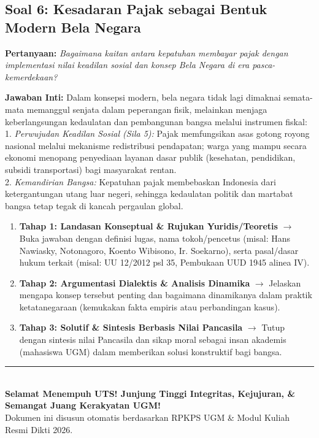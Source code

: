 \documentclass[10pt,a4paper]{article}
\begin{document}
\subsection{Soal 6: Kesadaran Pajak sebagai Bentuk Modern Bela Negara}
\textbf{Pertanyaan:} \textit{Bagaimana kaitan antara kepatuhan membayar pajak dengan implementasi nilai keadilan sosial dan konsep Bela Negara di era pasca-kemerdekaan?}
\begin{conceptbox}
\textbf{Jawaban Inti:} Dalam konsepsi modern, bela negara tidak lagi dimaknai semata-mata memanggul senjata dalam peperangan fisik, melainkan menjaga keberlangsungan kedaulatan dan pembangunan bangsa melalui instrumen fiskal:\\
1. \textit{Perwujudan Keadilan Sosial (Sila 5):} Pajak memfungsikan asas gotong royong nasional melalui mekanisme redistribusi pendapatan; warga yang mampu secara ekonomi menopang penyediaan layanan dasar publik (kesehatan, pendidikan, subsidi transportasi) bagi masyarakat rentan.\\
2. \textit{Kemandirian Bangsa:} Kepatuhan pajak membebaskan Indonesia dari ketergantungan utang luar negeri, sehingga kedaulatan politik dan martabat bangsa tetap tegak di kancah pergaulan global.
\end{conceptbox}

\begin{examtipbox}
\begin{enumerate}
  \item \textbf{Tahap 1: Landasan Konseptual \& Rujukan Yuridis/Teoretis} $\rightarrow$ Buka jawaban dengan definisi lugas, nama tokoh/pencetus (misal: Hans Nawiasky, Notonagoro, Koento Wibisono, Ir. Soekarno), serta pasal/dasar hukum terkait (misal: UU 12/2012 psl 35, Pembukaan UUD 1945 alinea IV).
  \item \textbf{Tahap 2: Argumentasi Dialektis \& Analisis Dinamika} $\rightarrow$ Jelaskan mengapa konsep tersebut penting dan bagaimana dinamikanya dalam praktik ketatanegaraan (kemukakan fakta empiris atau perbandingan kasus).
  \item \textbf{Tahap 3: Solutif \& Sintesis Berbasis Nilai Pancasila} $\rightarrow$ Tutup dengan sintesis nilai Pancasila dan sikap moral sebagai insan akademis (mahasiswa UGM) dalam memberikan solusi konstruktif bagi bangsa.
\end{enumerate}
\end{examtipbox}

\vspace{3mm}
\begin{center}
  \rule{0.5\linewidth}{0.6pt}\\[2mm]
  {\small\bfseries\color{ugmblue}Selamat Menempuh UTS! Junjung Tinggi Integritas, Kejujuran, \& Semangat Juang Kerakyatan UGM!}\\[1mm]
  {\footnotesize\color{gray}Dokumen ini disusun otomatis berdasarkan RPKPS UGM \& Modul Kuliah Resmi Dikti 2026.}
\end{center}
\end{document}
